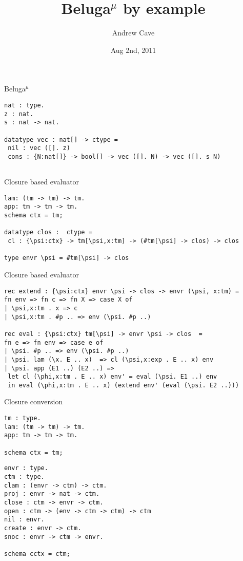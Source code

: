 \documentclass{beamer}
\title[]{Beluga$^\mu$ by example}
\author{Andrew Cave}
\date{Aug 2nd, 2011}
\begin{document}
\begin{frame}
\titlepage
\end{frame}

\begin{frame}[fragile]{Beluga$^\mu$}
\begin{lstlisting}
nat : type.
z : nat.
s : nat -> nat.

datatype vec : nat[] -> ctype =
 nil : vec ([]. z)
 cons : {N:nat[]} -> bool[] -> vec ([]. N) -> vec ([]. s N)
 
\end{lstlisting}
\end{frame}

\begin{frame}[fragile]{Closure based evaluator}
\begin{lstlisting}
lam: (tm -> tm) -> tm.              
app: tm -> tm -> tm.
schema ctx = tm;

datatype clos :  ctype =
 cl : {\psi:ctx} -> tm[\psi,x:tm] -> (#tm[\psi] -> clos) -> clos

type envr \psi = #tm[\psi] -> clos
\end{lstlisting}
\end{frame}

\begin{frame}[fragile]{Closure based evaluator}
\begin{lstlisting}
rec extend : {\psi:ctx} envr \psi -> clos -> envr (\psi, x:tm) =
fn env => fn c => fn X => case X of
| \psi,x:tm . x => c
| \psi,x:tm . #p .. => env (\psi. #p ..)

rec eval : {\psi:ctx} tm[\psi] -> envr \psi -> clos  =
fn e => fn env => case e of
| \psi. #p .. => env (\psi. #p ..)
| \psi. lam (\x. E .. x)  => cl (\psi,x:exp . E .. x) env
| \psi. app (E1 ..) (E2 ..) =>
 let cl (\phi,x:tm . E .. x) env' = eval (\psi. E1 ..) env
 in eval (\phi,x:tm . E .. x) (extend env' (eval (\psi. E2 ..)))
\end{lstlisting}
\end{frame}

\begin{frame}[fragile]{Closure conversion}

\begin{lstlisting}
tm : type.
lam: (tm -> tm) -> tm.              
app: tm -> tm -> tm.

schema ctx = tm;
\end{lstlisting}

\begin{lstlisting}
envr : type.
ctm : type.
clam : (envr -> ctm) -> ctm.
proj : envr -> nat -> ctm.
close : ctm -> envr -> ctm.
open : ctm -> (env -> ctm -> ctm) -> ctm
nil : envr.
create : envr -> ctm.
snoc : envr -> ctm -> envr.

schema cctx = ctm;
\end{lstlisting}
\end{frame}
\end{document}
